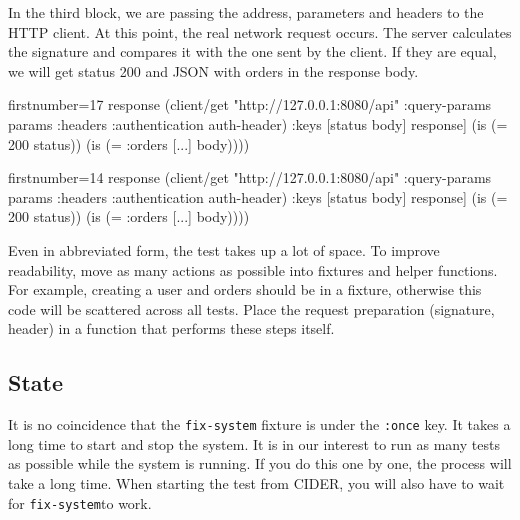 \fi

In the third block, we are passing the address, parameters and headers to the HTTP client. At this point, the real network request occurs. The server calculates the signature and compares it with the one sent by the client. If they are equal, we will get status 200 and JSON with orders in the response body.

\ifnarrow

\begin{english}
  \begin{clojure/lines*}{firstnumber=17}
    response
    (client/get
      "http://127.0.0.1:8080/api"
      {:query-params params
       :headers {:authentication
                 auth-header}})
    {:keys [status body]} response]
(is (= 200 status))
(is (= {:orders [...]} body))))
  \end{clojure/lines*}
\end{english}

\else

\begin{english}
  \begin{clojure/lines*}{firstnumber=14}
        response (client/get "http://127.0.0.1:8080/api"
                   {:query-params params
                    :headers {:authentication auth-header}})
        {:keys [status body]} response]
    (is (= 200 status))
    (is (= {:orders [...]} body))))
  \end{clojure/lines*}
\end{english}

\fi

Even in abbreviated form, the test takes up a lot of space. To improve readability, move as many actions as possible into fixtures and helper functions. For example, creating a user and orders should be in a fixture, otherwise this code will be scattered across all tests. Place the request preparation (signature, header) in a function that performs these steps itself.

\subsection{State}

It is no coincidence that the \verb|fix-system| fixture is under the \verb|:once| key. It takes a long time to start and stop the system. It is in our interest to run as many tests as possible while the system is running. If you do this one by one, the process will take a long time. When starting the test from CIDER, you will also have to wait for \verb|fix-system|to work.

